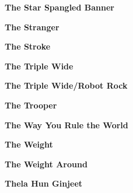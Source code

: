 \vspace{10pt} 
\begin{center}\textbf{The Star Spangled Banner}\end{center}
\newline
\vspace{10pt} 
\begin{center}\textbf{The Stranger}\end{center}
\newline
\vspace{10pt} 
\begin{center}\textbf{The Stroke}\end{center}
\newline
\vspace{10pt} 
\begin{center}\textbf{The Triple Wide}\end{center}
\newline
\vspace{10pt} 
\begin{center}\textbf{The Triple Wide/Robot Rock}\end{center}
\newline
\vspace{10pt} 
\begin{center}\textbf{The Trooper}\end{center}
\newline
\vspace{10pt} 
\begin{center}\textbf{The Way You Rule the World}\end{center}
\newline
\vspace{10pt} 
\begin{center}\textbf{The Weight}\end{center}
\newline
\vspace{10pt} 
\begin{center}\textbf{The Weight Around}\end{center}
\newline
\vspace{10pt} 
\begin{center}\textbf{Thela Hun Ginjeet}\end{center}
